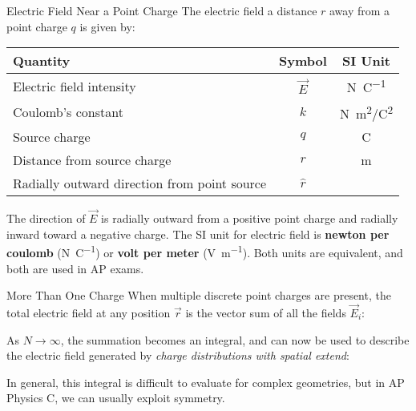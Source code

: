 \documentclass[12pt,aspectratio=169]{beamer}
\begin{document}
\begin{frame}{Electric Field Near a Point Charge}
  The electric field a distance $r$ away from a point charge $q$ is given by:

  \begin{center}
    \begin{tabular}{l|c|c}
      \rowcolor{pink}
      \textbf{Quantity} & \textbf{Symbol} & \textbf{SI Unit} \\ \hline
      Electric field intensity    & $\vec E$ & \si{\newton\per\coulomb}\\
      Coulomb's constant          & $k$   & \si{N.m^2/C^2} \\
      Source charge               & $q$   & \si\coulomb \\
      Distance from source charge & $r$ & \si\metre \\
      Radially outward direction from point source & $\hat r$ &
    \end{tabular}
  \end{center}
  The direction of $\vec E$ is radially outward from a positive point charge
  and radially inward toward a negative charge. The SI unit for electric field
  is \textbf{newton per coulomb} (\si{\newton\per\coulomb}) or
  \textbf{volt per meter} (\si{\volt\per\metre}). Both units are equivalent,
  and both are used in AP exams.
\end{frame}



\begin{frame}{More Than One Charge}
  When multiple discrete point charges are present, the total electric field at
  any position $\vec r$ is the vector sum of all the fields $\vec E_i$:
    

  As $N\rightarrow\infty$, the summation becomes an integral, and can now be
  used to describe the electric field generated by \emph{charge distributions
  with spatial extend}:

  
  In general, this integral is difficult to evaluate for complex geometries,
  but in AP Physics C, we can usually exploit symmetry.
\end{frame}
\end{document}
